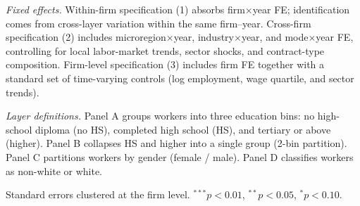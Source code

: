 \begin{table}[H]
\begin{minipage}{\linewidth}
\textit{Fixed effects.} Within-firm specification (1) absorbs firm$\times$year FE; identification comes from cross-layer variation within the same firm--year. Cross-firm specification (2) includes microregion$\times$year, industry$\times$year, and mode$\times$year FE, controlling for local labor-market trends, sector shocks, and contract-type composition. Firm-level specification (3) includes firm FE together with a standard set of time-varying controls (log employment, wage quartile, and sector trends).

\textit{Layer definitions.} Panel A groups workers into three education bins: no high-school diploma (no HS), completed high school (HS), and tertiary or above (higher). Panel B collapses HS and higher into a single group (2-bin partition). Panel C partitions workers by gender (female / male). Panel D classifies workers as non-white or white.

Standard errors clustered at the firm level. $^{***}p<0.01$, $^{**}p<0.05$, $^{*}p<0.10$.
\end{minipage}
\end{table}